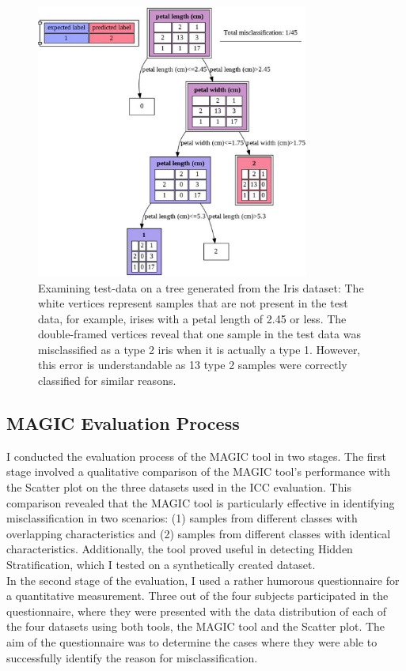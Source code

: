 \documentclass[12pt]{article}
\begin{document}
\begin{figure}[H]
\centering
\includegraphics[width=0.8\textwidth]{iris-magic.png}

\caption{Examining test-data on a tree generated from the Iris dataset: The white vertices represent samples that are not present in the test data, for example, irises with a petal length of 2.45 or less. The double-framed vertices reveal that one sample in the test data was misclassified as a type 2 iris when it is actually a type 1. However, this error is understandable as 13 type 2 samples were correctly classified for similar reasons.}
\label{fig:fig3}

\end{figure}

\subsection{MAGIC Evaluation Process}\label{MAGIC Evaluation Process}
I conducted the evaluation process of the MAGIC tool in two stages.
The first stage involved a qualitative comparison of the MAGIC tool's performance with the Scatter plot on the three datasets used in the ICC evaluation. This comparison revealed that the MAGIC tool is particularly effective in identifying misclassification in two scenarios: (1) samples from different classes with overlapping characteristics and (2) samples from different classes with identical characteristics. Additionally, the tool proved useful in detecting Hidden Stratification, which I tested on a synthetically created dataset.\\
In the second stage of the evaluation, I used a rather humorous questionnaire for a quantitative measurement. Three out of the four subjects participated in the questionnaire, where they were presented with the data distribution of each of the four datasets using both tools, the MAGIC tool and the Scatter plot. The aim of the questionnaire was to determine the cases where they were able to successfully identify the reason for misclassification.
\end{document}
